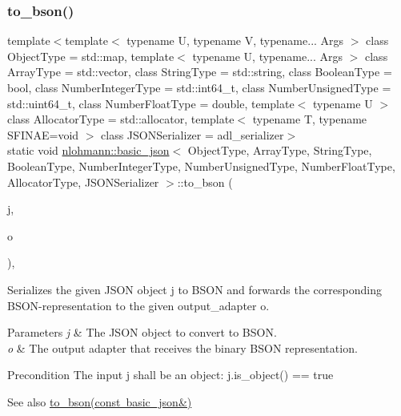\subsubsection{\texorpdfstring{to\+\_\+bson()}{to\_bson()}\hspace{0.1cm}{\footnotesize\ttfamily [3/3]}}
{\footnotesize\ttfamily template$<$template$<$ typename U, typename V, typename... Args $>$ class Object\+Type = std\+::map, template$<$ typename U, typename... Args $>$ class Array\+Type = std\+::vector, class String\+Type  = std\+::string, class Boolean\+Type  = bool, class Number\+Integer\+Type  = std\+::int64\+\_\+t, class Number\+Unsigned\+Type  = std\+::uint64\+\_\+t, class Number\+Float\+Type  = double, template$<$ typename U $>$ class Allocator\+Type = std\+::allocator, template$<$ typename T, typename S\+F\+I\+N\+A\+E=void $>$ class J\+S\+O\+N\+Serializer = adl\+\_\+serializer$>$ \\
static void \mbox{\hyperlink{classnlohmann_1_1basic__json}{nlohmann\+::basic\+\_\+json}}$<$ Object\+Type, Array\+Type, String\+Type, Boolean\+Type, Number\+Integer\+Type, Number\+Unsigned\+Type, Number\+Float\+Type, Allocator\+Type, J\+S\+O\+N\+Serializer $>$\+::to\+\_\+bson (\begin{DoxyParamCaption}\item[{const \mbox{\hyperlink{classnlohmann_1_1basic__json}{basic\+\_\+json}}$<$ Object\+Type, Array\+Type, String\+Type, Boolean\+Type, Number\+Integer\+Type, Number\+Unsigned\+Type, Number\+Float\+Type, Allocator\+Type, J\+S\+O\+N\+Serializer $>$ \&}]{j,  }\item[{\mbox{\hyperlink{classnlohmann_1_1detail_1_1output__adapter}{detail\+::output\+\_\+adapter}}$<$ char $>$}]{o }\end{DoxyParamCaption})\hspace{0.3cm}{\ttfamily [inline]}, {\ttfamily [static]}}



Serializes the given J\+S\+ON object {\ttfamily j} to B\+S\+ON and forwards the corresponding B\+S\+O\+N-\/representation to the given output\+\_\+adapter {\ttfamily o}. 


\begin{DoxyParams}{Parameters}
{\em j} & The J\+S\+ON object to convert to B\+S\+ON. \\
\hline
{\em o} & The output adapter that receives the binary B\+S\+ON representation. \\
\hline
\end{DoxyParams}
\begin{DoxyPrecond}{Precondition}
The input {\ttfamily j} shall be an object\+: {\ttfamily j.\+is\+\_\+object() == true} 
\end{DoxyPrecond}
\begin{DoxySeeAlso}{See also}
\mbox{\hyperlink{classnlohmann_1_1basic__json_a8ca5dd4f18b59e7022b04fd9bf7f5176}{to\+\_\+bson(const basic\+\_\+json\&)}} 
\end{DoxySeeAlso}
\mbox{\label{classnlohmann_1_1basic__json_a2566783e190dec524bf3445b322873b8}} 
